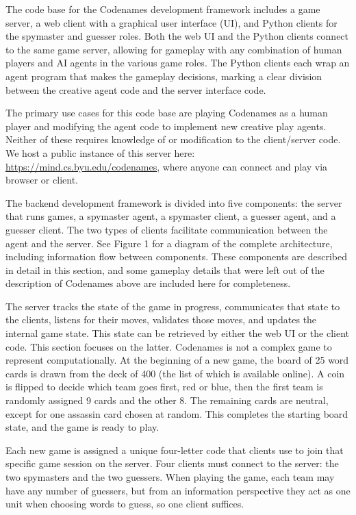 \documentclass[phd,electronic,oneside,twosidetoc,letterpaper,chaptercenter,parttop,lof]{byumsphd}
\begin{document}
The code base for the Codenames development framework includes a game server, a web client with a graphical user interface (UI), and Python clients for the spymaster and guesser roles. Both the web UI and the Python clients connect to the same game server, allowing for gameplay with any combination of human players and AI agents in the various game roles. The Python clients each wrap an agent program that makes the gameplay decisions, marking a clear division between the creative agent code and the server interface code.

The primary use cases for this code base are playing Codenames as a human player and modifying the agent code to implement new creative play agents. Neither of these requires knowledge of or modification to the client/server code. We host a public instance of this server here: \url{https://mind.cs.byu.edu/codenames}, where anyone can connect and play via browser or client.

The backend development framework is divided into five components: the server that runs games, a spymaster agent, a spymaster client, a guesser agent, and a guesser client. The two types of clients facilitate communication between the agent and the server. See Figure 1 for a diagram of the complete architecture, including information flow between components. These components are described in detail in this section, and some gameplay details that were left out of the description of Codenames above are included here for completeness. 

The server tracks the state of the game in progress, communicates that state to the clients, listens for their moves, validates those moves, and updates the internal game state. This state can be retrieved by either the web UI or the client code. This section focuses on the latter. Codenames is not a complex game to represent computationally. At the beginning of a new game, the board of 25 word cards is drawn from the deck of 400 (the list of which is available online). A coin is flipped to decide which team goes first, red or blue, then the first team is randomly assigned 9 cards and the other 8. The remaining cards are neutral, except for one assassin card chosen at random. This completes the starting board state, and the game is ready to play.

Each new game is assigned a unique four-letter code that clients use to join that specific game session on the server. Four clients must connect to the server: the two spymasters and the two guessers. When playing the game, each team may have any number of guessers, but from an information perspective they act as one unit when choosing words to guess, so one client suffices. 
\end{document}
